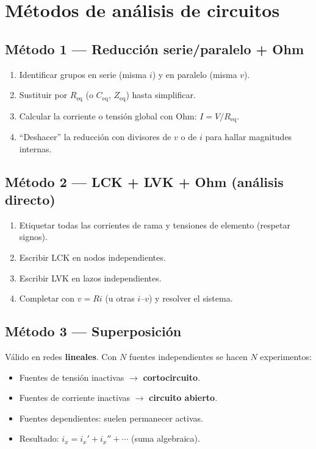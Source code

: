 \documentclass[11pt,a4paper]{article}
\begin{document}
\section{Métodos de análisis de circuitos}

\subsection{Método 1 --- Reducción serie/paralelo + Ohm}
\begin{enumerate}
  \item Identificar grupos en serie (misma \(i\)) y en paralelo (misma \(v\)).
  \item Sustituir por \(R_{\mathrm{eq}}\) (o \(C_{\mathrm{eq}}\), \(Z_{\mathrm{eq}}\)) hasta simplificar.
  \item Calcular la corriente o tensión global con Ohm: \(I=V/R_{\mathrm{eq}}\).
  \item ``Deshacer'' la reducción con divisores de \(v\) o de \(i\) para hallar magnitudes internas.
\end{enumerate}

\subsection{Método 2 --- LCK + LVK + Ohm (análisis directo)}
\begin{enumerate}
  \item Etiquetar todas las corrientes de rama y tensiones de elemento (respetar signos).
  \item Escribir LCK en nodos independientes.
  \item Escribir LVK en lazos independientes.
  \item Completar con \(v=Ri\) (u otras \(i\)--\(v\)) y resolver el sistema.
\end{enumerate}

\subsection{Método 3 --- Superposición}
Válido en redes \textbf{lineales}. Con \(N\) fuentes independientes se hacen \(N\) experimentos:
\begin{itemize}
  \item Fuentes de tensión inactivas \(\to\) \textbf{cortocircuito}.
  \item Fuentes de corriente inactivas \(\to\) \textbf{circuito abierto}.
  \item Fuentes dependientes: suelen permanecer activas.
  \item Resultado: \(i_x = i_x' + i_x'' + \cdots\) (suma algebraica).
\end{itemize}
\end{document}
